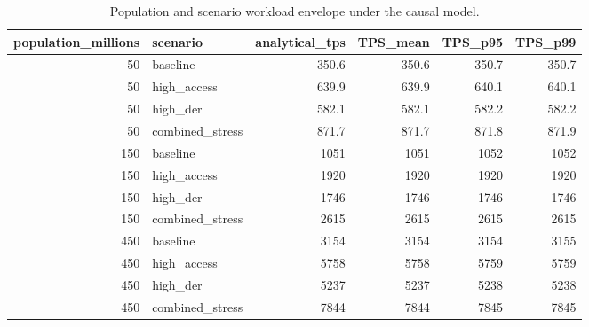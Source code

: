 \begin{table}[t]
\centering
\small
\caption{Population and scenario workload envelope under the causal model.}
\label{tab:scale-envelope}
\begin{tabular}{rlrrrr}
\toprule
population\_millions & scenario & analytical\_tps & TPS\_mean & TPS\_p95 & TPS\_p99 \\
\midrule
50 & baseline & 350.6 & 350.6 & 350.7 & 350.7 \\
50 & high\_access & 639.9 & 639.9 & 640.1 & 640.1 \\
50 & high\_der & 582.1 & 582.1 & 582.2 & 582.2 \\
50 & combined\_stress & 871.7 & 871.7 & 871.8 & 871.9 \\
150 & baseline & 1051 & 1051 & 1052 & 1052 \\
150 & high\_access & 1920 & 1920 & 1920 & 1920 \\
150 & high\_der & 1746 & 1746 & 1746 & 1746 \\
150 & combined\_stress & 2615 & 2615 & 2615 & 2615 \\
450 & baseline & 3154 & 3154 & 3154 & 3155 \\
450 & high\_access & 5758 & 5758 & 5759 & 5759 \\
450 & high\_der & 5237 & 5237 & 5238 & 5238 \\
450 & combined\_stress & 7844 & 7844 & 7845 & 7845 \\
\bottomrule
\end{tabular}
\end{table}

